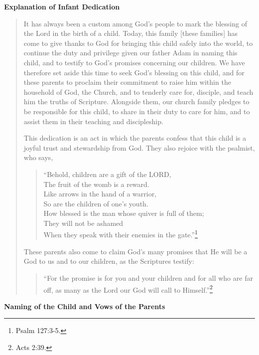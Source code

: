 \documentclass[
]{book}
\begin{document}
\textbf{Explanation of Infant Dedication}

\begin{quote}
It has always been a custom among God's people to mark the blessing of the Lord in the birth of a child. Today, this family {[}these families{]} has come to give thanks to God for bringing this child safely into the world, to continue the duty and privilege given our father Adam in naming this child, and to testify to God's promises concerning our children. We have therefore set aside this time to seek God's blessing on this child, and for these parents to proclaim their commitment to raise him within the household of God, the Church, and to tenderly care for, disciple, and teach him the truths of Scripture. Alongside them, our church family pledges to be responsible for this child, to share in their duty to care for him, and to assist them in their teaching and discipleship.

This dedication is an act in which the parents confess that this child is a joyful trust and stewardship from God. They also rejoice with the psalmist, who says,

\begin{quote}
``Behold, children are a gift of the LORD,\\
The fruit of the womb is a reward.\\
Like arrows in the hand of a warrior,\\
So are the children of one's youth.\\
How blessed is the man whose quiver is full of them;\\
They will not be ashamed\\
When they speak with their enemies in the gate.''\footnote{Psalm 127:3-5.}
\end{quote}

These parents also come to claim God's many promises that He will be a God to us and to our children, as the Scriptures testify:

\begin{quote}
``For the promise is for you and your children and for all who are far off, as many as the Lord our God will call to Himself.''\footnote{Acts 2:39.}
\end{quote}
\end{quote}

\textbf{Naming of the Child and Vows of the Parents}
\end{document}
